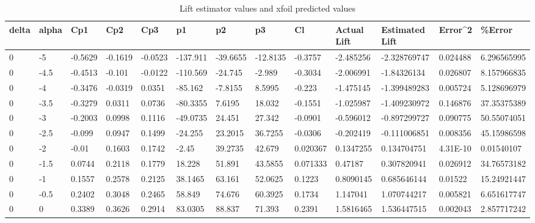 \tiny
\begin{longtable}{|l|l|l|l|l|l|l|l|l|l|l|l|l|}
\caption{Lift estimator values and xfoil predicted values}
\label{tab:mylabel}
\tabularnewline
\hline
delta & alpha & Cp1     & Cp2     & Cp3     & p1       & p2       & p3       & Cl       & Actual Lift & Estimated Lift & Error\textasciicircum{}2 & \%Error     \\ \hline
0     & -5    & -0.5629 & -0.1619 & -0.0523 & -137.911 & -39.6655 & -12.8135 & -0.3757  & -2.485256   & -2.328769747   & 0.024488                 & 6.296565995 \\ \hline
0     & -4.5  & -0.4513 & -0.101  & -0.0122 & -110.569 & -24.745  & -2.989   & -0.3034  & -2.006991   & -1.84326134    & 0.026807                 & 8.157966835 \\ \hline
0     & -4    & -0.3476 & -0.0319 & 0.0351  & -85.162  & -7.8155  & 8.5995   & -0.223   & -1.475145   & -1.399489283   & 0.005724                 & 5.128696979 \\ \hline
0     & -3.5  & -0.3279 & 0.0311  & 0.0736  & -80.3355 & 7.6195   & 18.032   & -0.1551  & -1.025987   & -1.409230972   & 0.146876                 & 37.35375389 \\ \hline
0     & -3    & -0.2003 & 0.0998  & 0.1116  & -49.0735 & 24.451   & 27.342   & -0.0901  & -0.596012   & -0.897299727   & 0.090775                 & 50.55074051 \\ \hline
0     & -2.5  & -0.099  & 0.0947  & 0.1499  & -24.255  & 23.2015  & 36.7255  & -0.0306  & -0.202419   & -0.111006851   & 0.008356                 & 45.15986598 \\ \hline
0     & -2    & -0.01   & 0.1603  & 0.1742  & -2.45    & 39.2735  & 42.679   & 0.020367 & 0.1347255   & 0.134704751    & 4.31E-10                 & 0.01540107  \\ \hline
0     & -1.5  & 0.0744  & 0.2118  & 0.1779  & 18.228   & 51.891   & 43.5855  & 0.071333 & 0.47187     & 0.307820941    & 0.026912                 & 34.76573182 \\ \hline
0     & -1    & 0.1557  & 0.2578  & 0.2125  & 38.1465  & 63.161   & 52.0625  & 0.1223   & 0.8090145   & 0.685646144    & 0.01522                  & 15.24921447 \\ \hline
0     & -0.5  & 0.2402  & 0.3048  & 0.2465  & 58.849   & 74.676   & 60.3925  & 0.1734   & 1.147041    & 1.070744217    & 0.005821                 & 6.651617747 \\ \hline
0     & 0     & 0.3389  & 0.3626  & 0.2914  & 83.0305  & 88.837   & 71.393   & 0.2391   & 1.5816465   & 1.536447515    & 0.002043                 & 2.857717242 \\ \hline

\end{longtable}
